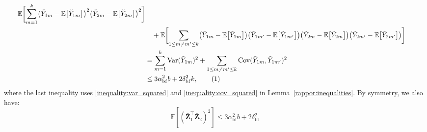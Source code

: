 \documentclass[twoside,11pt]{article}
\newcommand\numberthis{\addtocounter{equation}{1}\tag{\theequation}}
\newcommand{\rvTwo}{Y}
\newcommand{\rvThree}{Z}
\newcommand{\vectorize}[1]{\mathbf{#1}}
\newcommand{\private}[1]{\tilde{#1}}
\newcommand{\mE}{\mathbb{E}} %
\newcommand{\normSqMultinomMax}{b}
\newcommand{\alphabetSize}{k} %
\newcommand{\vectorIndex}{m}
\newcommand{\privacyParameter}{\alpha} %
\newcommand{\privacyParameterrappor}{\privacyParameter_{\mathrm{bf}}}
\newcommand{\smallNumber}{\delta}
\newcommand{\smallNumberrappor}{\smallNumber_{\mathrm{bf}}}
\begin{document}
\begin{appendix}
\begin{itemize}
\begin{align*}
		\mE
		\biggl[ %
		\sum_{\vectorIndex = 1}^\alphabetSize %
		\bigl( %
		\private{\rvTwo}_{1 \vectorIndex}
		- %
		\mE
		\bigl[
		\private{\rvTwo}_{1 \vectorIndex}
		\bigr]
		\bigr)^2%
		\bigl( %
		\private{\rvTwo}_{2 \vectorIndex}
		-
		\mE
		\bigl[
		\private{\rvTwo}_{2 \vectorIndex}
		\bigr]
		\bigr)^2%
		\biggr]
		\\  & \quad+ %
		\mE
		\biggl[ %
		\sum_{1 \leq \vectorIndex \neq \vectorIndex' \leq \alphabetSize} %
		\bigl( %
		\private{\rvTwo}_{1 \vectorIndex}
		- %
		\mE
		\bigl[
		\private{\rvTwo}_{1 \vectorIndex}
		\bigr]
		\bigr)%
		\bigl( %
		\private{\rvTwo}_{1 \vectorIndex'}
		- %
		\mE
		\bigl[
		\private{\rvTwo}_{1 \vectorIndex'}
		\bigr]
		\bigr)%
		\bigl( %
		\private{\rvTwo}_{2 \vectorIndex}
		-
		\mE
		\bigl[
		\private{\rvTwo}_{2 \vectorIndex}
		\bigr]
		\bigr)%
		\bigl( %
		\private{\rvTwo}_{2 \vectorIndex'}
		-
		\mE
		\bigl[
		\private{\rvTwo}_{2 \vectorIndex'}
		\bigr]
		\bigr)%
		\biggr]
		\\&= %
		\sum_{\vectorIndex = 1}^\alphabetSize
		\mathrm{Var}(\private{Y}_{1 \vectorIndex})^2
		+
		\sum_{1 \leq \vectorIndex \neq \vectorIndex' \leq \alphabetSize}
		\mathrm{Cov}(\private{Y}_{1 \vectorIndex}, \private{Y}_{1 \vectorIndex'})^2
		\\&\leq
		3
		\privacyParameterrappor^2
		\normSqMultinomMax
		+
		2
		\smallNumberrappor^2
		\alphabetSize,
		\numberthis
		\label{term:multinomial:upper:rappor_elltwo:EY1Y2:bound}
	\end{align*}
	where the last inequality uses  \eqref{inequality:var_squared} and \eqref{inequality:cov_squared} in Lemma~\ref{rappor:inequalities}. 
	By symmetry, we also have:
	\begin{equation}\label{term:multinomial:upper:rappor_elltwo:EZ1Z2:bound}
		\mE[
		(
		\bar{\vectorize{\rvThree}}_1^\top 
		\bar{\vectorize{\rvThree}}_2
		)^2
		]
		\leq
		3
		\privacyParameterrappor^2
		\normSqMultinomMax
		+
		2
		\smallNumberrappor^2

\end{equation}
\end{itemize}
\end{appendix}
\end{document}
